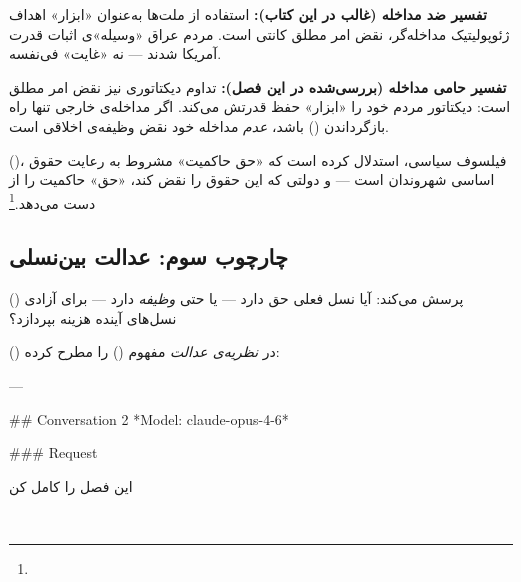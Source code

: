 \begin{tcolorbox}[wavebox, title={استدلال کانتی: دو تفسیر متضاد}]
\textbf{تفسیر ضد مداخله (غالب در این کتاب):}
استفاده از ملت‌ها به‌عنوان «ابزار» اهداف ژئوپولیتیک مداخله‌گر، نقض امر مطلق کانتی است. مردم عراق «وسیله»ی اثبات قدرت آمریکا شدند — نه «غایت» فی‌نفسه.

\textbf{تفسیر حامی مداخله (بررسی‌شده در این فصل):}
تداوم دیکتاتوری نیز نقض امر مطلق است: دیکتاتور مردم خود را «ابزار» حفظ قدرتش می‌کند. اگر مداخله‌ی خارجی تنها راه بازگرداندن  () باشد، \textit{عدم} مداخله خود نقض وظیفه‌ی اخلاقی است.

 ()، فیلسوف سیاسی، استدلال کرده است که «حق حاکمیت» مشروط به رعایت حقوق اساسی شهروندان است — و دولتی که این حقوق را نقض کند، «حق» حاکمیت را از دست می‌دهد.\footnote{}
\end{tcolorbox}

\subsection{چارچوب سوم: عدالت بین‌نسلی}
\label{subsec:ch15-intergenerational}

 () پرسش می‌کند: آیا نسل فعلی حق دارد — یا حتی \textit{وظیفه} دارد — برای آزادی نسل‌های آینده هزینه بپردازد؟

 () در \textit{نظریه‌ی عدالت} مفهوم  () را مطرح کرده:

---

## Conversation 2
*Model: claude-opus-4-6*

### Request

این فصل را کامل کن

‍‍